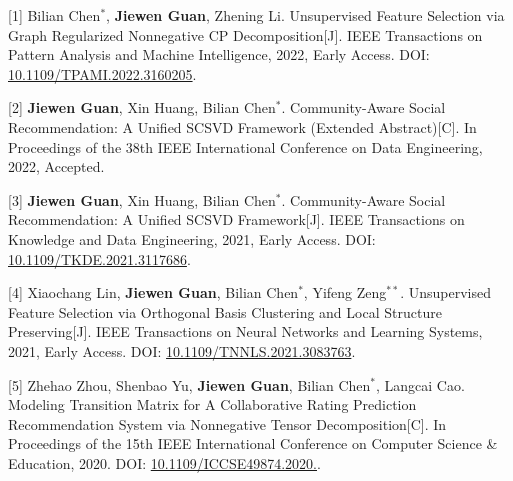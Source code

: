 \begin{publications}

[1] Bilian Chen$^{*}$, \textbf{Jiewen Guan}, Zhening Li. Unsupervised Feature Selection via Graph Regularized Nonnegative CP Decomposition[J]. IEEE Transactions on Pattern Analysis and Machine Intelligence, 2022, Early Access. DOI: \href{https://doi.org/10.1109/TPAMI.2022.3160205}{10.1109/TPAMI.2022.3160205}.

[2] \textbf{Jiewen Guan}, Xin Huang, Bilian Chen$^{*}$. Community-Aware Social Recommendation: A Unified SCSVD Framework (Extended Abstract)[C]. In Proceedings of the 38th IEEE International Conference on Data Engineering, 2022, Accepted.

[3] \textbf{Jiewen Guan}, Xin Huang, Bilian Chen$^{*}$. Community-Aware Social Recommendation: A Unified SCSVD Framework[J]. IEEE Transactions on Knowledge and Data Engineering, 2021, Early Access. DOI: \href{https://doi.org/10.1109/TKDE.2021.3117686}{10.1109/TKDE.2021.3117686}.

[4] Xiaochang Lin, \textbf{Jiewen Guan}, Bilian Chen$^{*}$, Yifeng Zeng$^{**}$. Unsupervised Feature Selection via Orthogonal Basis Clustering and Local Structure Preserving[J]. IEEE Transactions on Neural Networks and Learning Systems, 2021, Early Access. DOI: \href{https://doi.org/10.1109/TNNLS.2021.3083763}{10.1109/TNNLS.2021.3083763}.

[5] Zhehao Zhou, Shenbao Yu, \textbf{Jiewen Guan}, Bilian Chen$^{*}$, Langcai Cao. Modeling Transition Matrix for A Collaborative Rating Prediction Recommendation System via Nonnegative Tensor Decomposition[C]. In Proceedings of the 15th IEEE International Conference on Computer Science \& Education, 2020. DOI: \href{https://doi.org/10.1109/ICCSE49874.2020.9201809}{10.1109/ICCSE49874.2020.}.

\afterpage{\null\newpage}\clearpage

\end{publications}
